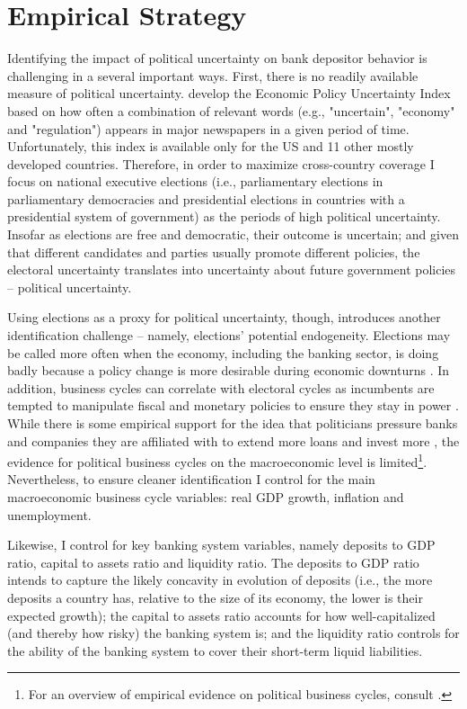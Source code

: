 \documentclass[12pt,a4paper]{article}
\begin{document}
\section{Empirical Strategy}\label{idstrat}
Identifying the impact of political uncertainty on bank depositor behavior is challenging in a several important ways. First, there is no readily available measure of political uncertainty. \citet{baker2016measuring} develop the Economic Policy Uncertainty Index based on how often a combination of relevant words (e.g., "uncertain", "economy" and "regulation") appears in major newspapers in a given period of time. Unfortunately, this index is available only for the US and 11 other mostly developed countries. Therefore, in order to maximize cross-country coverage I focus on national executive elections (i.e., parliamentary elections in parliamentary democracies and presidential elections in countries with a presidential system of government) as the periods of high political uncertainty. Insofar as elections are free and democratic, their outcome is uncertain; and given that different candidates and parties usually promote different policies, the electoral uncertainty translates into uncertainty about future government policies -- political uncertainty.

Using elections as a proxy for political uncertainty, though, introduces another identification challenge -- namely, elections' potential endogeneity. Elections may be called more often when the economy, including the banking sector, is doing badly because a policy change is more desirable during economic downturns \citep{pastor2012uncertainty}. In addition, business cycles can correlate with electoral cycles as incumbents are tempted to manipulate fiscal and monetary policies to ensure they stay in power \citep{nordhaus1975political}. While there is some empirical support for the idea that politicians pressure banks and companies they are affiliated with to extend more loans and invest more \citep[][among others]{dincc2005politicians, bertrand2007politicians}, the evidence for political business cycles on the macroeconomic level is limited\footnote{For an overview of empirical evidence on political business cycles, consult \citet{drazen2000political}.}. Nevertheless, to ensure cleaner identification I control for the main macroeconomic business cycle variables: real GDP growth, inflation and unemployment.

Likewise, I control for key banking system variables, namely deposits to GDP ratio, capital to assets ratio and liquidity ratio. The deposits to GDP ratio intends to capture the likely concavity in evolution of deposits (i.e., the more deposits a country has, relative to the size of its economy, the lower is their expected growth); the capital to assets ratio accounts for how well-capitalized (and thereby how risky) the banking system is; and the liquidity ratio controls for the ability of the banking system to cover their short-term liquid liabilities.
\end{document}
